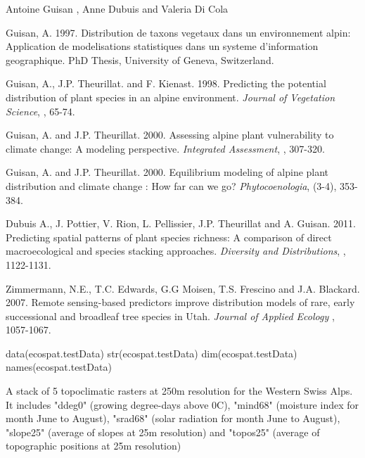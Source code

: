 \documentclass[a4paper]{book}
\begin{document}
%
\begin{Author}\relax
Antoine Guisan , Anne Dubuis  and Valeria Di Cola 
\end{Author}
%
\begin{References}\relax
Guisan, A. 1997. Distribution de taxons vegetaux dans un environnement alpin: Application de modelisations statistiques dans un systeme d'information geographique. PhD Thesis, University of Geneva, Switzerland.

Guisan, A., J.P. Theurillat. and F. Kienast. 1998. Predicting the potential distribution of plant species in an alpine environment. \emph{Journal of Vegetation Science}, , 65-74.

Guisan, A. and J.P. Theurillat. 2000. Assessing alpine plant vulnerability to climate change: A modeling perspective. \emph{Integrated Assessment}, , 307-320.

Guisan, A. and J.P. Theurillat. 2000. Equilibrium modeling of alpine plant distribution and climate change : How far can we go? \emph{Phytocoenologia}, (3-4), 353-384.

Dubuis A., J. Pottier, V. Rion, L. Pellissier, J.P. Theurillat and A. Guisan. 2011. Predicting spatial patterns of plant species richness: A comparison of direct macroecological and species stacking approaches. \emph{Diversity and Distributions}, , 1122-1131.

Zimmermann, N.E., T.C. Edwards, G.G Moisen, T.S. Frescino and J.A. Blackard. 2007. Remote sensing-based predictors improve distribution models of rare, early successional and broadleaf tree species in Utah. \emph{Journal of Applied Ecology} , 1057-1067.
\end{References}
%
\begin{Examples}
\begin{ExampleCode}
data(ecospat.testData)
str(ecospat.testData)
dim(ecospat.testData)
names(ecospat.testData)
\end{ExampleCode}
\end{Examples}
%
\begin{Description}\relax
A stack of 5 topoclimatic rasters at 250m resolution for the Western Swiss Alps. It includes "ddeg0" (growing degree-days above 0C), "mind68" (moisture index for month June to August),  "srad68" (solar radiation for month June to August), "slope25" (average of slopes at 25m resolution) and "topos25" (average of topographic positions at 25m resolution)
\end{Description}
\end{document}
